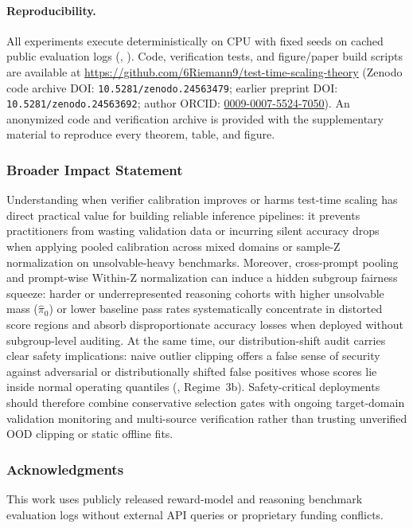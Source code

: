 \documentclass[10pt]{article}
\theoremstyle{plain}
\theoremstyle{definition}
\theoremstyle{remark}
\begin{document}
\paragraph{Reproducibility.}
All experiments execute deterministically on CPU with fixed seeds on cached public evaluation logs (, ).
\ifdefined\USEPREPRINT
Code, verification tests, and figure/paper build scripts are available at \url{https://github.com/6Riemann9/test-time-scaling-theory} (Zenodo code archive DOI: \texttt{10.5281/zenodo.24563479}; earlier preprint DOI: \texttt{10.5281/zenodo.24563692}; author ORCID: \href{https://orcid.org/0009-0007-5524-7050}{0009-0007-5524-7050}).
\else
An anonymized code and verification archive is provided with the supplementary material to reproduce every theorem, table, and figure.
\fi

\subsubsection*{Broader Impact Statement}
Understanding when verifier calibration improves or harms test-time scaling has direct practical value for building reliable inference pipelines: it prevents practitioners from wasting validation data or incurring silent accuracy drops when applying pooled calibration across mixed domains or sample-Z normalization on unsolvable-heavy benchmarks. Moreover, cross-prompt pooling and prompt-wise $\mathrm{Within\text{-}Z}$ normalization can induce a hidden subgroup fairness squeeze: harder or underrepresented reasoning cohorts with higher unsolvable mass ($\hat{\pi}_0$) or lower baseline pass rates systematically concentrate in distorted score regions and absorb disproportionate accuracy losses when deployed without subgroup-level auditing. At the same time, our distribution-shift audit carries clear safety implications: naive outlier clipping offers a false sense of security against adversarial or distributionally shifted false positives whose scores lie inside normal operating quantiles (, Regime~3b). Safety-critical deployments should therefore combine conservative selection gates with ongoing target-domain validation monitoring and multi-source verification rather than trusting unverified OOD clipping or static offline fits.

\ifdefined\USEPREPRINT
\subsubsection*{Acknowledgments}
This work uses publicly released reward-model and reasoning benchmark evaluation logs without external API queries or proprietary funding conflicts.
\fi
\end{document}

